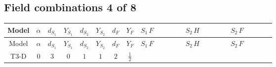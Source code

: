 \documentclass[8pt]{article}
\begin{document}
\begin{landscape}
\subsection*{Field combinations 4 of 8}
\begin{longtable}{@{}cccccccc >{\raggedright\arraybackslash}p{0.21\linewidth} >{\raggedright\arraybackslash}p{0.21\linewidth} >{\raggedright\arraybackslash}p{0.21\linewidth}@{}}
\toprule
Model & $\alpha$ & $d_{S_1}$ & $Y_{S_1}$ & $d_{S_2}$ & $Y_{S_2}$ & $d_F$ & $Y_F$ & $S_1\,F$ & $S_2\,H$ & $S_2\,F$ \\
\midrule
\endfirsthead
\toprule
Model & $\alpha$ & $d_{S_1}$ & $Y_{S_1}$ & $d_{S_2}$ & $Y_{S_2}$ & $d_F$ & $Y_F$ & $S_1\,F$ & $S_2\,H$ & $S_2\,F$ \\
\midrule
\endhead
T3-D & $0$ & $3$ & $0$ & $1$ & $1$ & $2$ & $\frac{1}{2}$ & \scriptsize\adjustbox{max width=\linewidth}{$\begin{gathered} +\frac{2}{3} \hbar  \log \left(\frac{\bar{\mu}^{2}}{M_F^2}\right) \overline{y_{1,i_1,r_1}} \overline{y_{1,i_2,r_2}} S_{1,j_2}^2 y_{1,i_1,r_2} y_{1,i_2,r_1} \left(S_{1,j_1}{}^{\dagger }\right){}^2 \\ +\frac{2 C_{S_1^\dagger S_1} \hbar  \log \left(\frac{\bar{\mu}^{2}}{M_F^2}\right) \overline{y_{1,i_1,r_1}} S_{1,j_1} y_{1,i_1,r_1} S_{1,j_1}{}^{\dagger }}{\sqrt{3}} \\ -\frac{4}{3} \hbar  \log \left(\frac{\bar{\mu}^{2}}{M_F^2}\right) \overline{y_{1,i_1,r_1}} \overline{y_{1,i_2,r_2}} S_{1,j_1} S_{1,j_2} y_{1,i_1,r_2} y_{1,i_2,r_1} S_{1,j_1}{}^{\dagger } S_{1,j_2}{}^{\dagger }\end{gathered}$} & \scriptsize\adjustbox{max width=\linewidth}{$\begin{gathered} -\frac{2 \hbar  \overline{y_{2,i_1,r_1}} \overline{Y_{e,i_2,i_3}} H_{a_1} S_2 y_{2,i_2,r_1} Y_{e,i_1,i_3} H_{a_1}{}^{\dagger } S_2{}^{\dagger }}{\epsilon } \\ -2 \hbar  \overline{y_{2,i_1,r_1}} \overline{Y_{e,i_2,i_3}} H_{a_1} S_2 y_{2,i_2,r_1} Y_{e,i_1,i_3} H_{a_1}{}^{\dagger } S_2{}^{\dagger } \\ +H_{a_2} S_2 H_{a_1}{}^{\dagger } S_2{}^{\dagger } \mathcal{I}_{H2,a_1,a_2}{}^1 \lambda_{HS_2}^{(1)}^{(1)}\end{gathered}$} & \scriptsize\adjustbox{max width=\linewidth}{$\begin{gathered} -2 \hbar  \log \left(\frac{\bar{\mu}^{2}}{M_F^2}\right) \overline{y_{2,i_1,r_1}} \overline{y_{2,i_2,r_2}} S_2^2 y_{2,i_1,r_2} y_{2,i_2,r_1} \left(S_2{}^{\dagger }\right){}^2 \\ +2 C_{S_2^\dagger S_2} \hbar  \log \left(\frac{\bar{\mu}^{2}}{M_F^2}\right) \overline{y_{2,i_1,r_1}} S_2 y_{2,i_1,r_1} S_2{}^{\dagger } \\ -2 \hbar  \log \left(\frac{\bar{\mu}^{2}}{M_F^2}\right) \overline{y_{2,i_1,r_1}} S_2^2 y_{2,i_1,r_1} \left(S_2{}^{\dagger }\right){}^2 \lambda_{S_2}^{(1)}^{(1)}\end{gathered}$} \\

\end{longtable}
\end{landscape}
\end{document}
